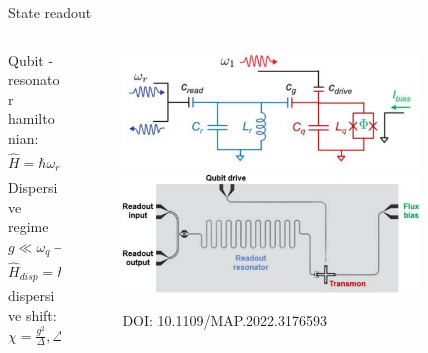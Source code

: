\documentclass[aspectratio=169,10pt]{beamer}
\begin{document}
%
\begin{frame}[t,fragile]{State readout}
  \begin{columns}
    \begin{column}{0.35\textwidth}
    Qubit - resonator hamiltonian:
    \begin{equation*}
      \hat{H} = \hbar\omega_r\hat{a}\hat{a}^\dagger - \frac{\hbar\omega_{01}}{2}\hat{\sigma}_z + \hbar g(\hat{\sigma}^+\hat{a}+\hat{\sigma}^-\hat{a}^\dagger)
    \end{equation*}
    Dispersive regime $g \ll \omega_q - \omega_r$
    \begin{equation*}
      \hat{H}_{disp} = \hbar(\omega_r - \chi\hat{\sigma}_z)\hat{a}^\dagger\hat{a} - \frac{\hbar}{2}(\omega_{01}+\chi)\hat{\sigma}_z
    \end{equation*}
    dispersive shift: $\chi = \frac{g^2}{\Delta}, \Delta = \omega_q - \omega_r$
  \end{column}
    \begin{column}{0.65\textwidth}
      \begin{center}
        \begin{figure}
          \vspace{2mm}
          \includegraphics[width=0.85\textwidth]{figures/TransmonCircuit.png}
          \vfill
          \includegraphics[width=0.85\textwidth]{figures/TransmonBoard.png}
          \caption{DOI: 10.1109/MAP.2022.3176593}
        \end{figure}
      \end{center}
    \end{column}
  \end{columns}
\end{frame}
%
%  
\end{document}
